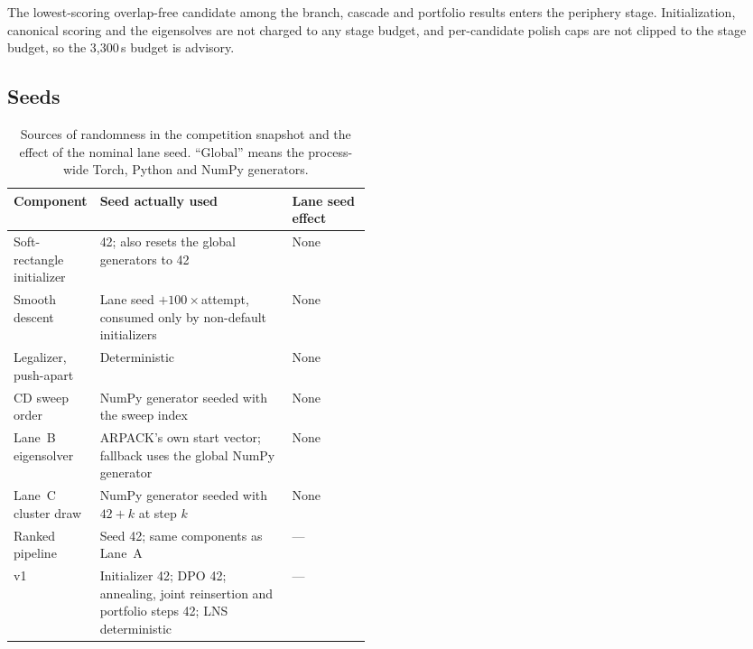 The lowest-scoring overlap-free candidate among the branch, cascade and portfolio
results enters the periphery stage. Initialization, canonical scoring and the
eigensolves are not charged to any stage budget, and per-candidate polish caps are
not clipped to the stage budget, so the 3,300\,s budget is advisory.

\subsection{Seeds}\label{app:alg-seeds}

\begin{table}[htbp]
\centering\footnotesize
\caption{Sources of randomness in the competition snapshot and the effect of the
nominal lane seed. ``Global'' means the process-wide Torch, Python and NumPy
generators.}
\label{tab:seeds}
\begin{tabularx}{\linewidth}{@{}>{\raggedright\arraybackslash}p{0.24\linewidth}
                Y
                >{\raggedright\arraybackslash}p{0.22\linewidth}@{}}
\toprule
Component & Seed actually used & Lane seed effect \\
\midrule
Soft-rectangle initializer & 42; also resets the global generators to 42 & None \\
Smooth descent & Lane seed $+100\times$attempt, consumed only by non-default initializers & None \\
Legalizer, push-apart & Deterministic & None \\
CD sweep order & NumPy generator seeded with the sweep index & None \\
Lane~B eigensolver & ARPACK's own start vector; fallback uses the global NumPy generator & None \\
Lane~C cluster draw & NumPy generator seeded with $42+k$ at step $k$ & None \\
Ranked pipeline & Seed 42; same components as Lane~A & --- \\
v1 & Initializer 42; DPO 42; annealing, joint reinsertion and portfolio steps 42; LNS deterministic & --- \\
\bottomrule
\end{tabularx}
\end{table}

